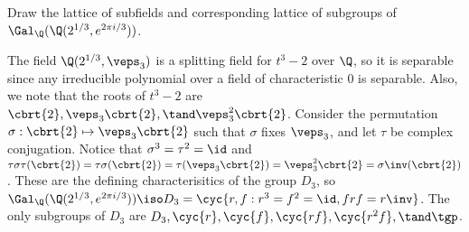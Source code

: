 \documentclass{article}
\begin{document}
\begin{subexercise} \label{qs:fiveb} %
Draw the lattice of subfields and corresponding lattice of subgroups of \\
\( \Gal_\Q(\Q(2^{1/3}, e^{2\pi i / 3})) \).
\end{subexercise}
\begin{solution}
The field \( \Q(2^{1/3}, \veps_3) \) is a splitting field for \( t^3-2 \) over \( \Q \), so it is separable since any irreducible polynomial over a field of characteristic 0 is separable.
Also, we note that the roots of \( t^3-2 \) are \( \cbrt{2}, \veps_3\cbrt{2}, \tand \veps_3^2\cbrt{2} \).
Consider the permutation \( \sigma: \cbrt{2}\mapsto \veps_3\cbrt{2} \) such that \( \sigma \) fixes \( \veps_3 \), and let \( \tau \) be complex conjugation.
Notice that \( \sigma^3 = \tau^2 = \id \) and \( \tau\sigma\tau(\cbrt{2}) = \tau\sigma(\cbrt{2}) = \tau(\veps_3\cbrt{2}) = \veps_3^2\cbrt{2} = \sigma\inv(\cbrt{2}) \).
These are the defining characterisitics of the group \( D_3 \), so \( \Gal_\Q(\Q(2^{1/3}, e^{2\pi i / 3})) \iso D_3 = \cyc{r,f : r^3 = f^2 = \id, frf = r\inv}\).
The only subgroups of \( D_3 \) are \( D_3,\cyc{r}, \cyc{f}, \cyc{rf}, \cyc{r^2f}, \tand\tgp \).
\end{solution}
\end{document}
